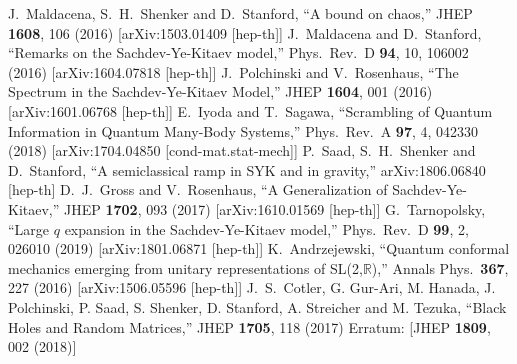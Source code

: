 \begin{thebibliography}{99}
	J.~Maldacena, S.~H.~Shenker and D.~Stanford,
  ``A bound on chaos,''
  JHEP {\bf 1608}, 106 (2016)
  [arXiv:1503.01409 [hep-th]]
	J.~Maldacena and D.~Stanford,
  ``Remarks on the Sachdev-Ye-Kitaev model,''
  Phys.\ Rev.\ D {\bf 94}, 10, 106002 (2016)
  [arXiv:1604.07818 [hep-th]]
	J.~Polchinski and V.~Rosenhaus,
  ``The Spectrum in the Sachdev-Ye-Kitaev Model,''
  JHEP {\bf 1604}, 001 (2016)
  [arXiv:1601.06768 [hep-th]]
	E.~Iyoda and T.~Sagawa,
  ``Scrambling of Quantum Information in Quantum Many-Body Systems,''
  Phys.\ Rev.\ A {\bf 97}, 4, 042330 (2018)
  [arXiv:1704.04850 [cond-mat.stat-mech]]
	P.~Saad, S.~H.~Shenker and D.~Stanford,
  ``A semiclassical ramp in SYK and in gravity,''
  arXiv:1806.06840 [hep-th]
	D.~J.~Gross and V.~Rosenhaus,
  ``A Generalization of Sachdev-Ye-Kitaev,''
  JHEP {\bf 1702}, 093 (2017)
  [arXiv:1610.01569 [hep-th]]
	G.~Tarnopolsky,
  ``Large $q$ expansion in the Sachdev-Ye-Kitaev model,''
  Phys.\ Rev.\ D {\bf 99}, 2, 026010 (2019)
  [arXiv:1801.06871 [hep-th]]
	K.~Andrzejewski,
  ``Quantum conformal mechanics emerging from unitary representations of SL(2,$\mathbb{R}$),''
  Annals Phys.\  {\bf 367}, 227 (2016)
  [arXiv:1506.05596 [hep-th]]
	J.~S.~Cotler, G. Gur-Ari, M. Hanada, J. Polchinski, P. Saad,
	S. Shenker, D. Stanford, A. Streicher and M. Tezuka,
  ``Black Holes and Random Matrices,''
  JHEP {\bf 1705}, 118 (2017)
  Erratum: [JHEP {\bf 1809}, 002 (2018)]

\end{thebibliography}
